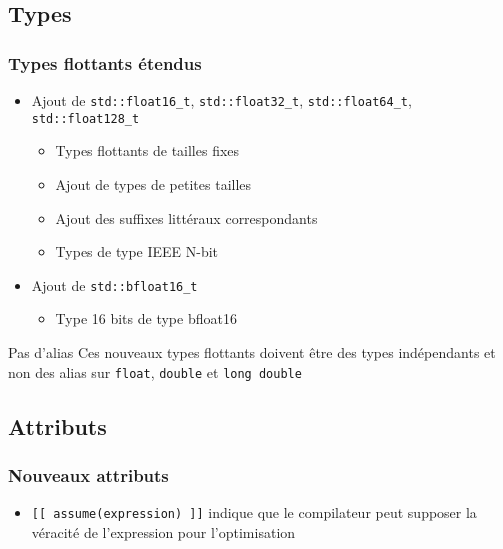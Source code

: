 \documentclass[C++.tex]{subfiles}
\begin{document}
\subsection*{Types}
\begin{frame}[fragile]
	\frametitle{Types flottants étendus}
	\begin{itemize}
		\item Ajout de \lstinline|std::float16_t|, \lstinline|std::float32_t|, \lstinline|std::float64_t|, \lstinline|std::float128_t|
		\begin{itemize}
			\item Types flottants de tailles fixes
			\item Ajout de types de petites tailles
			\item Ajout des suffixes littéraux correspondants
			\item Types de type IEEE N-bit
		\end{itemize}
		\item Ajout de \lstinline|std::bfloat16_t|
		\begin{itemize}
			\item Type 16 bits de type bfloat16
		\end{itemize}
	\end{itemize}
	
	\begin{alertblock}{Pas d'alias}
		Ces nouveaux types flottants doivent être des types indépendants et non des alias sur \lstinline|float|, \lstinline|double| et \lstinline|long double|
	\end{alertblock}
\end{frame}

\subsection*{Attributs}
\begin{frame}[fragile]
	\frametitle{Nouveaux attributs}
	\begin{itemize}
		\item \lstinline|[[ assume(expression) ]]| indique que le compilateur peut supposer la véracité de l'expression pour l'optimisation
	\end{itemize}
\end{frame}
\end{document}
